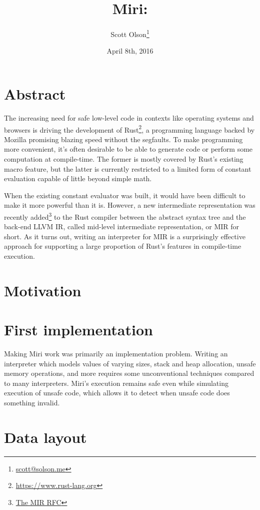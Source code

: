 \documentclass[twocolumn]{article}
\begin{document}
\title{Miri: \\ }
\author{Scott Olson\footnote{\href{mailto:scott@solson.me}{scott@solson.me}} \\
  }
\date{April 8th, 2016}
\maketitle

\section{Abstract}

The increasing need for safe low-level code in contexts like operating systems and browsers is
driving the development of Rust\footnote{\url{https://www.rust-lang.org}}, a programming language
backed by Mozilla promising blazing speed without the segfaults. To make programming more
convenient, it's often desirable to be able to generate code or perform some computation at
compile-time. The former is mostly covered by Rust's existing macro feature, but the latter is
currently restricted to a limited form of constant evaluation capable of little beyond simple math.

When the existing constant evaluator was built, it would have been difficult to make it more
powerful than it is. However, a new intermediate representation was recently
added\footnote{\href{https://github.com/rust-lang/rfcs/blob/master/text/1211-mir.md}{The MIR RFC}}
to the Rust compiler between the abstract syntax tree and the back-end LLVM IR, called mid-level
intermediate representation, or MIR for short. As it turns out, writing an interpreter for MIR is a
surprisingly effective approach for supporting a large proportion of Rust's features in compile-time
execution.

\section{Motivation}

\blindtext

\section{First implementation}

Making Miri work was primarily an implementation problem. Writing an interpreter which models values
of varying sizes, stack and heap allocation, unsafe memory operations, and more requires some
unconventional techniques compared to many interpreters. Miri's execution remains safe even while
simulating execution of unsafe code, which allows it to detect when unsafe code does something
invalid.

\blindtext[2]

\section{Data layout}

\blindtext
\end{document}
